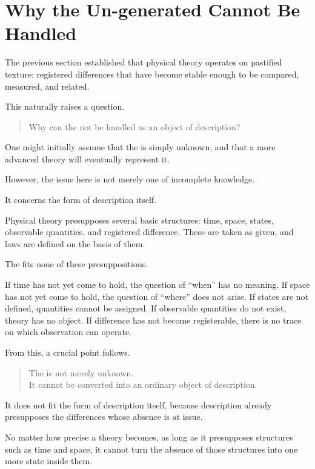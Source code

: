 \section{Why the Un-generated Cannot Be Handled}

\label{sec:ungenerated}

The previous section established that physical theory operates on
pastified texture:
registered differences that have become stable enough to be compared,
measured,
and related.

This naturally raises a question.

\medskip
\begin{quote}
Why can the \ungenerated{} not be handled as an object of description?
\end{quote}
\medskip

One might initially assume that the \ungenerated{} is simply unknown,
and that a more advanced theory will eventually represent it.

However, the issue here is not merely one of incomplete knowledge.

It concerns the form of description itself.

Physical theory presupposes several basic structures:
time,
space,
states,
observable quantities,
and registered difference.
These are taken as given,
and laws are defined on the basis of them.

The \ungenerated{} fits none of these presuppositions.

If time has not yet come to hold,
the question of ``when'' has no meaning.
If space has not yet come to hold,
the question of ``where'' does not arise.
If states are not defined,
quantities cannot be assigned.
If observable quantities do not exist,
theory has no object.
If difference has not become registerable,
there is no trace on which observation can operate.

From this, a crucial point follows.

\medskip
\begin{quote}
The \ungenerated{} is not merely unknown.\\
It cannot be converted into an ordinary object of description.
\end{quote}
\medskip

It does not fit the form of description itself,
because description already presupposes the differences
whose absence is at issue.

No matter how precise a theory becomes,
as long as it presupposes structures such as time and space,
it cannot turn the absence of those structures
into one more state inside them.

